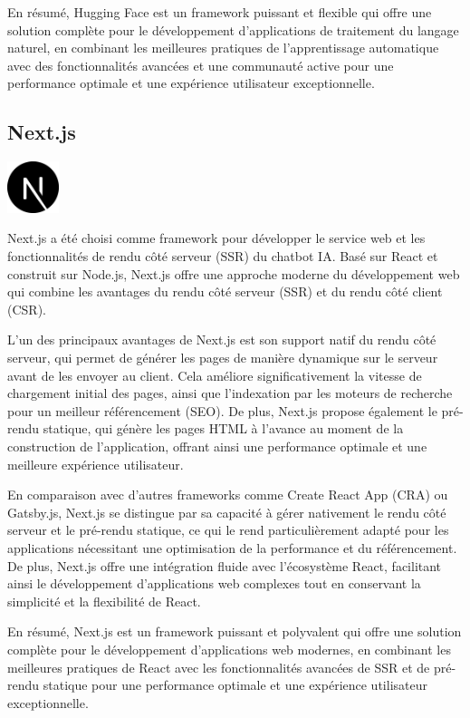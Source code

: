\documentclass[a4paper, 11pt, openany]{report}
\begin{document}
En résumé, Hugging Face est un framework puissant et flexible qui offre une solution complète pour le développement d'applications de traitement du langage naturel, en combinant les meilleures pratiques de l'apprentissage automatique avec des fonctionnalités avancées et une communauté active pour une performance optimale et une expérience utilisateur exceptionnelle.



\subsection{Next.js}
\begin{center}
\includegraphics[height=1.5cm]{images/next.png}
\end{center}

Next.js a été choisi comme framework pour développer le service web et les fonctionnalités de rendu côté serveur (SSR) du chatbot IA. Basé sur React et construit sur Node.js, Next.js offre une approche moderne du développement web qui combine les avantages du rendu côté serveur (SSR) et du rendu côté client (CSR). 

L'un des principaux avantages de Next.js est son support natif du rendu côté serveur, qui permet de générer les pages de manière dynamique sur le serveur avant de les envoyer au client. Cela améliore significativement la vitesse de chargement initial des pages, ainsi que l'indexation par les moteurs de recherche pour un meilleur référencement (SEO). De plus, Next.js propose également le pré-rendu statique, qui génère les pages HTML à l'avance au moment de la construction de l'application, offrant ainsi une performance optimale et une meilleure expérience utilisateur.

En comparaison avec d'autres frameworks comme Create React App (CRA) ou Gatsby.js, Next.js se distingue par sa capacité à gérer nativement le rendu côté serveur et le pré-rendu statique, ce qui le rend particulièrement adapté pour les applications nécessitant une optimisation de la performance et du référencement. De plus, Next.js offre une intégration fluide avec l'écosystème React, facilitant ainsi le développement d'applications web complexes tout en conservant la simplicité et la flexibilité de React.

En résumé, Next.js est un framework puissant et polyvalent qui offre une solution complète pour le développement d'applications web modernes, en combinant les meilleures pratiques de React avec les fonctionnalités avancées de SSR et de pré-rendu statique pour une performance optimale et une expérience utilisateur exceptionnelle.
\end{document}
